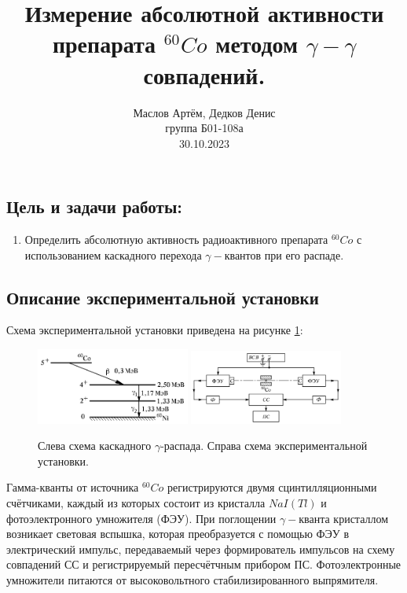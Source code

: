 \documentclass[10pt,a4paper]{article}
\author{\normalsize Маслов Артём, Дедков Денис \\
	\normalsize группа Б01-108а \\
	\normalsize 30.10.2023}
\date{}
\title{
	\Large Измерение абсолютной активности препарата ${}^{60}Co$ методом $\gamma-\gamma$ совпадений. \\ 
}
\begin{document}
\maketitle
	
	\subsection*{Цель и задачи работы:}
	\begin{enumerate}
		\item Определить абсолютную активность радиоактивного препарата ${}^{60}Co$ с использованием каскадного перехода $\gamma-$квантов при его распаде.
	\end{enumerate}
	
	\subsection*{Описание экспериментальной установки}
	
	Схема экспериментальной установки приведена на рисунке \ref{img:exp_scheme}:
	\begin{figure}[H]
		\centering
		\includegraphics[width=0.45\textwidth]{images/radio_scheme.png}
		\includegraphics[width=0.45\textwidth]{images/exp_scheme.png}
		\caption{Слева схема каскадного $\gamma$-распада. Справа схема экспериментальной установки.}
		\label{img:exp_scheme}
	\end{figure}

	Гамма-кванты от источника ${}^{60}Co$ регистрируются двумя сцинтилляционными счётчиками, каждый из которых состоит из кристалла $NaI(Tl)$ и фотоэлектронного умножителя (ФЭУ). При поглощении $\gamma-$кванта кристаллом возникает световая вспышка, которая преобразуется с помощью ФЭУ в электрический импульс, передаваемый через формирователь импульсов на схему совпадений СС и регистрируемый пересчётчным прибором ПС. Фотоэлектронные умножители питаются от высоковольтного стабилизированного выпрямителя.
	
\end{document}
